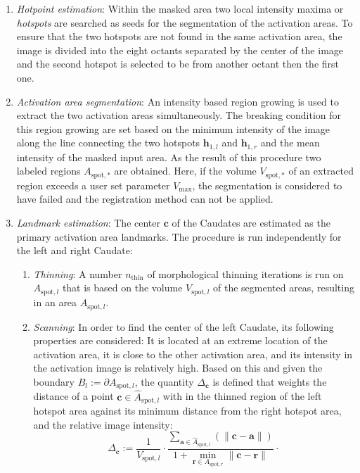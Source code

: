 \documentclass{frontiers}
\newcommand{\emitem}[1]{\item \emph{#1}}
\newcommand{\pc}{\ensuremath{\mathbf{c}}}
\newcommand{\pa}{\ensuremath{\mathbf{a}}}
\newcommand{\pr}{\ensuremath{\mathbf{r}}}
\newcommand{\hp}[1]{\ensuremath{\mathbf{h}_{#1}}}
\newcounter{myalgorithm}
\newenvironment{myalgorithm}[1][]{%
  \begin{mdframed}[style=algstyle,frametitle={\refstepcounter{myalgorithm}Algorithm \themyalgorithm: #1}]%
}{%
  \end{mdframed}
}
\begin{document}
\begin{myalgorithm}[Extraction of landmarks related to activation areas\label{alg:lspots}]
  \begin{enumerate}
  \emitem{Hotpoint estimation}: Within the masked area two local intensity maxima or \emph{hotspots}  are searched as seeds 
    for the segmentation of the activation areas. 
  To ensure that the two hotspots are not found in the same activation area, the image is divided into the 
    eight octants separated by the center of the image and the second hotspot is selected to be 
    from another octant then the first one. 
  \emitem{Activation area segmentation}: An intensity based region growing is used to extract the two activation 
     areas simultaneously. 
  The breaking condition for this region growing are set based on the minimum intensity of the image along the line 
    connecting the two hotspots \hp{1,l} and \hp{1,r} and the mean intensity of the masked input area.
  As the result of this procedure two labeled regions $A_{\text{spot},*}$ are obtained. 
  Here, if the volume $V_{\text{spot},*}$ of an extracted region exceeds a user set parameter $V_{\text{max}}$, 
    the segmentation is considered to have failed and the registration method can not be applied.
  \emitem{Landmark estimation}: The center $\pc$ of the Caudates are estimated as the primary activation area landmarks.
    The procedure is run independently for the left and right Caudate:
  \begin{enumerate}
  \emitem{Thinning}: A number $n_{\text{thin}}$ of morphological thinning iterations \citep{lee_building_1994} is run on 
    $A_{\text{spot},l}$ that is based on the volume $V_{\text{spot},l}$ of the segmented areas, 
    resulting in an area $\hat{A}_{\text{spot},l}$. 
  \emitem{Scanning}: In order to find the center of the left Caudate, its following properties are considered: 
  It is located at an extreme location of the activation area, it is close to the other activation area, and 
    its intensity in the activation image is relatively high. 
  Based on this and given the boundary $B_l:= \partial A_{\text{spot},l}$, 
     the quantity $\Delta_{\pc}$ is defined that weights the distance of a point $\pc \in \hat{A}_{\text{spot},l}$ 
    with in the thinned region of the left hotspot area against its minimum distance from the right hotspot area, 
    and the relative image intensity: 
  \begin{equation}
    \Delta_{\pc} := \frac{1}{V_{\text{spot},l}} \cdot 
                   \frac{\sum_{\pa \in \hat{A}_{\text{spot},l}}(\|\pc-\pa\|) }{1 + \min_{\pr \in A_{\text{spot},r}}\|\pc-\pr\| } \cdot 

\end{equation}
\end{enumerate}
\end{enumerate}
\end{myalgorithm}
\end{document}
